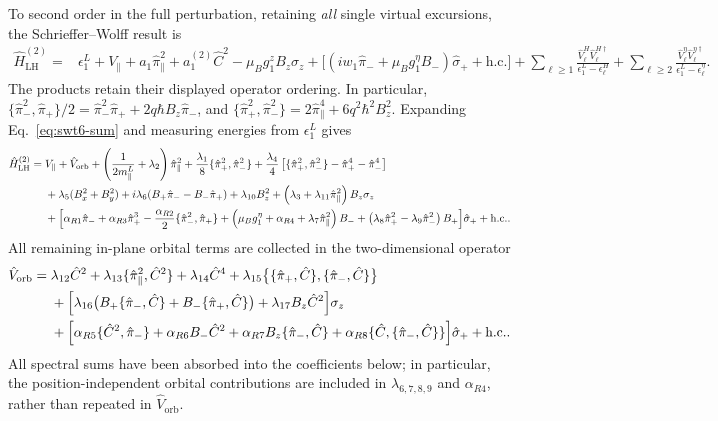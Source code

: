 \documentclass[10pt,letterpaper]{article}
\newcommand{\hc}{\mathrm{h.c.}}
\newcommand{\ep}{\epsilon}
\newcommand{\LH}{\mathrm{LH}}
\begin{document}
To second order in the full perturbation, retaining \emph{all} single
virtual excursions, the Schrieffer--Wolff result is
\begin{equation}
 \begin{aligned}
 \hat H_\LH^{(2)}={}&\ep_1^L+V_\parallel
 +a_1\hat\pi_\parallel^2+a_1^{(2)}\hat C^2
 -\mu_Bg_1^zB_z\sigma_z
 +\bigl[(iw_1\hat\pi_-+\mu_Bg_1^\eta B_-)\hat\sigma_++\hc\bigr]
 +\sum_{\ell\ge1}\frac{\hat V_\ell^H\hat V_\ell^{H\dagger}}
 {\ep_1^L-\ep_\ell^H}
 +\sum_{\ell\ge2}\frac{\hat V_\ell^\eta\hat V_\ell^{\eta\dagger}}
 {\ep_1^L-\ep_\ell^\eta}.
 \end{aligned}
 \label{eq:swt6-sum}
\end{equation}
The products retain their displayed operator ordering. In particular,
$\{\hat\pi_-^2,\hat\pi_+\}/2
=\hat\pi_-^2\hat\pi_++2q\hbar B_z\hat\pi_-$, and
$\{\hat\pi_+^2,\hat\pi_-^2\}
=2\hat\pi_\parallel^4+6q^2\hbar^2B_z^2$.
Expanding Eq.~\eqref{eq:swt6-sum} and measuring energies from
$\ep_1^L$ gives
\begin{align}
\hat H_\LH^{(2)}={}&V_\parallel+\hat V_{\mathrm{orb}}
+\left(\frac{1}{2m_\parallel^L}+\lambda_2\right)\hat\pi_\parallel^2
+\frac{\lambda_1}{8}\{\hat\pi_+^2,\hat\pi_-^2\}
+\frac{\lambda_4}{4}
\left[\{\hat\pi_+^2,\hat\pi_-^2\}-\hat\pi_+^4-\hat\pi_-^4\right]
\nonumber\\
&+\lambda_5(B_x^2+B_y^2)
+i\lambda_6(B_+\hat\pi_--B_-\hat\pi_+)
+\lambda_{10}B_z^2
+\left(\lambda_3+\lambda_{11}\hat\pi_\parallel^2\right)B_z\sigma_z
\nonumber\\
&+\Bigl[
\alpha_{R1}\hat\pi_-
+\alpha_{R3}\hat\pi_+^3
-\frac{\alpha_{R2}}{2}\{\hat\pi_-^2,\hat\pi_+\}
+\left(\mu_Bg_1^\eta+\alpha_{R4}+\lambda_7\hat\pi_\parallel^2\right)B_-
+\left(\lambda_8\hat\pi_+^2-\lambda_9\hat\pi_-^2\right)B_+
\Bigr]\hat\sigma_++\hc.
\label{eq:swt6-Heff}
\end{align}
All remaining in-plane orbital terms are collected in the two-dimensional
operator
\begin{align}
\hat V_{\mathrm{orb}}={}&
\lambda_{12}\hat C^2
+\lambda_{13}\{\hat\pi_\parallel^2,\hat C^2\}
+\lambda_{14}\hat C^4
+\lambda_{15}\bigl\{\{\hat\pi_+,\hat C\},\{\hat\pi_-,\hat C\}\bigr\}
\nonumber\\
&+\Bigl[
\lambda_{16}\bigl(B_+\{\hat\pi_-,\hat C\}+B_-\{\hat\pi_+,\hat C\}\bigr)
+\lambda_{17}B_z\hat C^2
\Bigr]\sigma_z
\nonumber\\
&+\Bigl[
\alpha_{R5}\{\hat C^2,\hat\pi_-\}
+\alpha_{R6}B_-\hat C^2
+\alpha_{R7}B_z\{\hat\pi_-,\hat C\}
+\alpha_{R8}\{\hat C,\{\hat\pi_-,\hat C\}\}
\Bigr]\hat\sigma_++\hc.
\label{eq:swt6-Vorb}
\end{align}
All spectral sums have been absorbed into the coefficients below; in
particular, the position-independent orbital contributions are included
in $\lambda_{6,7,8,9}$ and $\alpha_{R4}$, rather than repeated in
$\hat V_{\mathrm{orb}}$.
\end{document}
